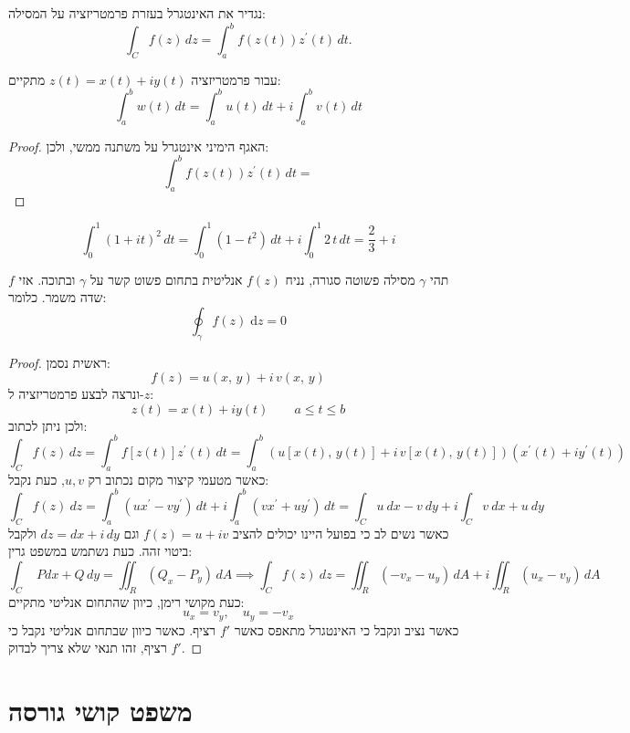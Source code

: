 \documentclass{tstextbook}
\begin{document}
\begin{definition}
נגדיר את האינטגרל בעזרת פרמטריזציה על המסילה:
$$\int_{C}f(z)\,d z=\int_{a}^{b}f\left(z(t)\right)z^{\prime}(t)\,d t.$$

\end{definition}
\begin{proposition}
עבור פרמטריזציה \(z(t)=x(t)+iy(t)\) מתקיים:
$$\int_{a}^{b}w(t)\,d t=\int_{a}^{b}u(t)\,d t+i\int_{a}^{b}v(t)\,d t$$

\end{proposition}
\begin{proof}
האגף הימיני אינטגרל על משתנה ממשי, ולכן:
$$\int_{a}^{b}f\left(z(t)\right)z^{\prime}(t)\,d t=$$

\end{proof}
\begin{example}
$$\int_{0}^{1}(1+i t)^{2}\,d t=\int_{0}^{1}(1-t^{2})\,d t+i\int_{0}^{1}2\,t\,d t={\frac{2}{3}}+i$$

\end{example}
\begin{theorem}
תהי \(\gamma\) מסילה פשוטה סגורה, נניח \(f(z)\) אנליטית בתחום פשוט קשר על \(\gamma\) ובתוכה. אזי \(f\) שדה משמר. כלומר:
$$\oint_{\gamma}f(z)\;\mathrm{d}z=0$$

\end{theorem}
\begin{proof}
ראשית נסמן:
$$f(z)=u(x,\,y)+i\,v(x,\,y)$$
ונרצה לבצע פרמטריזציה ל-\(z\):
$$z(t)=x(t)+i y(t) \qquad  a\leq t\leq b$$
ולכן ניתן לכתוב:
$$\int_{C}f(z)\,d z=\int_{a}^{b}f[z(t)]z^{\prime}(t)\,d t= \int_{a}^{b} \left( u\left[ x(t),\,y(t) \right]+i\,v\left[ x(t),\,y(t) \right] \right)(x^{\prime}(t)+i y^{\prime}(t))$$
כאשר מטעמי קיצור מקום נכתוב רק \(u,v\), כעת נקבל:
$$\int_{C}f(z)\ d z=\int_{a}^{b}(u x^{\prime}-v y^{\prime})\,d t+i\int_{a}^{b}(v x^{\prime}+u y^{\prime})\,d t=\int_{C}u\ d x-v\ d y+i\int_{C}v\ d x+u\ d y$$
כאשר נשים לב כי בפועל היינו יכולים להציב \(f(z)=u+iv\) וגם \(dz=dx+i\,dy\) ולקבל ביטוי זהה.
כעת נשתמש במשפט גרין:
$$\int_{C}\,\,P d x+Q\,d y=\iint_{R}(Q_{x}-P_{y})\,d A \implies \int_{C}f(z)\ d z=\iint_{R}(-v_{x}-u_{y})\,d A+i\iint_{R}(u_{x}-v_{y})\,d A$$
כעת מקושי רימן, כיוון שהתחום אנליטי מתקיים:
$$u_{x}=v_{y},\quad u_{y}=-v_{x}$$
כאשר נציב ונקבל כי האינטגרל מתאפס כאשר \(f'\) רציף. כאשר כיוון שבתחום אנליטי נקבל כי \(f'\) רציף, זהו תנאי שלא צריך לבדוק.

\end{proof}
\section{משפט קושי גורסה}
\end{document}
